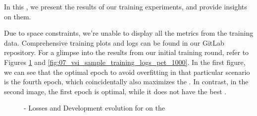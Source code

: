 

In this \headerName{}, we present the results of our training experiments, and provide insights on them.


Due to space constraints, we're unable to display all the metrics from the training data. Comprehensive training plots and logs can be found in our GitLab repository. For a glimpse into the results from our initial training round, refer to Figures \ref{fig:07_vsi_sample_training_logs_unbalanced} and \ref{fig:07_vsi_sample_training_logs_pet_1000}. 
In the first figure, we can see that the optimal epoch to avoid overfitting in that particular scenario is the fourth epoch, which coincidentally also maximizes the \fTwo{}. 
In contrast, in the second image, the first epoch is optimal, while it does not have the best \fTwo{}.



\begin{figure}[ht]
    \centering
    \hfill
    \hfill
    \caption{\unbalanced{} - Losses and Development \fTwo{} evolution for \bertmultilingual{} on the \trafilaturaTitle{}}
    \label{fig:07_vsi_sample_training_logs_unbalanced}
\end{figure}


